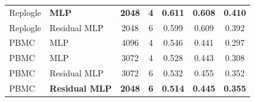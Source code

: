 \begin{table}[t]
\begin{tabular}{@{}llccccc@{}}
\midrule
Replogle & \textbf{MLP} & \textbf{2048} & \textbf{4} & \textbf{0.611} & \textbf{0.608} & \textbf{0.410} \\
Replogle & Residual MLP & 2048 & 6 & 0.599 & 0.609 & 0.392 \\
\midrule
PBMC & MLP & 4096 & 4 & 0.546 & 0.441 & 0.297 \\
PBMC & MLP & 3072 & 4 & 0.528 & 0.443 & 0.308 \\
PBMC & Residual MLP & 3072 & 6 & 0.532 & 0.455 & 0.352 \\
PBMC & \textbf{Residual MLP} & \textbf{2048} & \textbf{6} & \textbf{0.514} & \textbf{0.445} & \textbf{0.355} \\
\bottomrule
\end{tabular}
\end{table}
